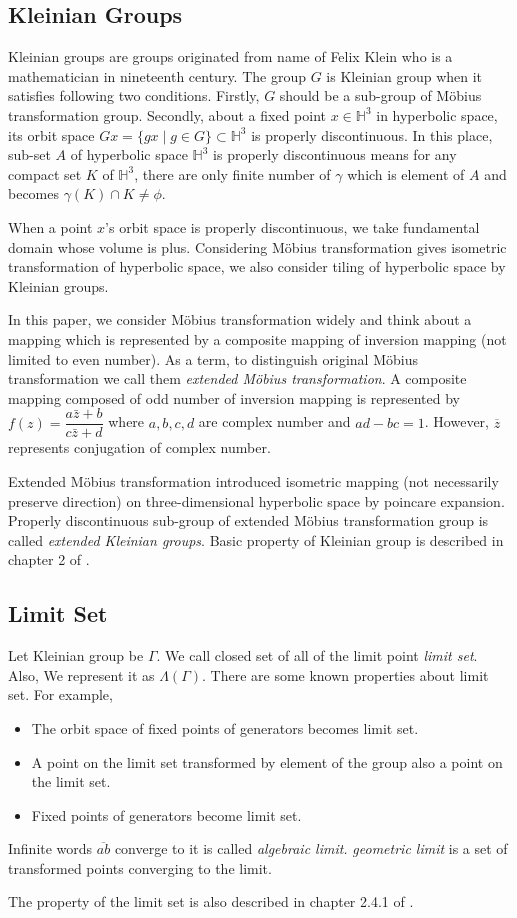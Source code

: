 \subsection{Kleinian Groups}

Kleinian groups are groups originated from name of Felix Klein who is
a mathematician in nineteenth century.
The group $G$ is Kleinian group when it satisfies following two
conditions. 
Firstly, $G$ should be a sub-group of M\"obius transformation group.
Secondly, about a fixed point $x\in\mathbb{H}^3$ in hyperbolic space,
its orbit space $Gx = \{ gx \mid g\in G\}\subset \mathbb{H}^3$
is properly discontinuous.
In this place, sub-set $A$ of hyperbolic space $\mathbb{H}^3$
is properly discontinuous means
for any compact set $K$ of $\mathbb{H}^3$,
there are only finite number of $\gamma$ which is element of $A$
and becomes $\gamma (K) \cap K \neq \phi$.

When a point $x$'s orbit space is properly discontinuous, we take
fundamental domain whose volume is plus.
Considering M\"obius transformation gives isometric transformation of
hyperbolic space, we also consider tiling of hyperbolic space by
Kleinian groups. 

In this paper, we consider M\"obius transformation widely and
think about a mapping which is represented by a composite mapping of
inversion mapping (not limited to even number).
As a term, to distinguish original M\"obius transformation
we call them \textit{extended M\"obius transformation}.
A composite mapping composed of odd number of inversion mapping
is represented by $f(z)=\dfrac{a{\bar{z}}+b}{c{\bar{z}}+d}$ where
$a, b, c, d$ are complex number and $ad-bc = 1$.
However, $\overline{z}$ represents conjugation of complex number.

Extended M\"obius transformation introduced isometric mapping (not
necessarily preserve direction) on three-dimensional hyperbolic space by
poincare expansion.
Properly discontinuous sub-group of extended M\"obius transformation group
is called \textit{extended Kleinian groups}.
Basic property of Kleinian group is described in chapter 2 of \cite{marden_2016}.

\subsection{Limit Set}

Let Kleinian group be $\Gamma$.
We call closed set of all of the limit point \textit{limit set}.
Also, We represent it as $\Lambda(\Gamma)$.
There are some known properties about limit set.
For example,
\begin{itemize}
 \item The orbit space of fixed points of generators becomes limit set.
 \item A point on the limit set transformed by element of the group 
       also a point on the limit set.
 \item Fixed points of generators become limit set.
\end{itemize}

Infinite words $\overline{ab}$ converge to it is called \textit{algebraic limit.}
\textit{geometric limit} is a set of transformed points converging to
the limit.

The property of the limit set is also described in chapter 2.4.1 of
\cite{marden_2016}.